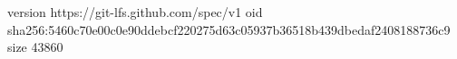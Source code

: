 version https://git-lfs.github.com/spec/v1
oid sha256:5460c70e00c0e90ddebcf220275d63c05937b36518b439dbedaf2408188736c9
size 43860
